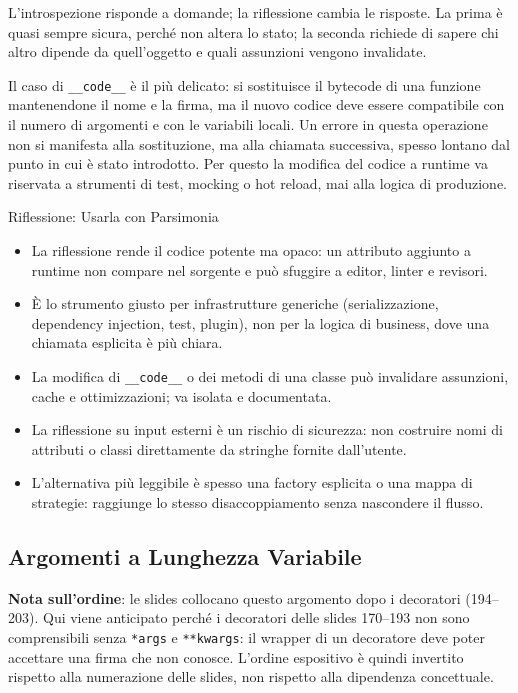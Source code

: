 \documentclass[12pt]{extarticle}
\begin{document}
\noindent L'introspezione risponde a domande; la riflessione cambia le risposte. La prima è quasi sempre sicura, perché non altera lo stato; la seconda richiede di sapere chi altro dipende da quell'oggetto e quali assunzioni vengono invalidate.

\noindent Il caso di \texttt{\_\_code\_\_} è il più delicato: si sostituisce il bytecode di una funzione mantenendone il nome e la firma, ma il nuovo codice deve essere compatibile con il numero di argomenti e con le variabili locali. Un errore in questa operazione non si manifesta alla sostituzione, ma alla chiamata successiva, spesso lontano dal punto in cui è stato introdotto. Per questo la modifica del codice a runtime va riservata a strumenti di test, mocking o hot reload, mai alla logica di produzione.

\begin{cbox}{Riflessione: Usarla con Parsimonia}
\begin{itemize}
    \item La riflessione rende il codice potente ma opaco: un attributo aggiunto a runtime non compare nel sorgente e può sfuggire a editor, linter e revisori.
    \item È lo strumento giusto per infrastrutture generiche (serializzazione, dependency injection, test, plugin), non per la logica di business, dove una chiamata esplicita è più chiara.
    \item La modifica di \texttt{\_\_code\_\_} o dei metodi di una classe può invalidare assunzioni, cache e ottimizzazioni; va isolata e documentata.
    \item La riflessione su input esterni è un rischio di sicurezza: non costruire nomi di attributi o classi direttamente da stringhe fornite dall'utente.
    \item L'alternativa più leggibile è spesso una factory esplicita o una mappa di strategie: raggiunge lo stesso disaccoppiamento senza nascondere il flusso.
\end{itemize}
\end{cbox}

\subsection{Argomenti a Lunghezza Variabile}

\noindent \textbf{Nota sull'ordine}: le slides collocano questo argomento dopo i decoratori (194--203). Qui viene anticipato perché i decoratori delle slides 170--193 non sono comprensibili senza \texttt{*args} e \texttt{**kwargs}: il wrapper di un decoratore deve poter accettare una firma che non conosce. L'ordine espositivo è quindi invertito rispetto alla numerazione delle slides, non rispetto alla dipendenza concettuale.
\end{document}
